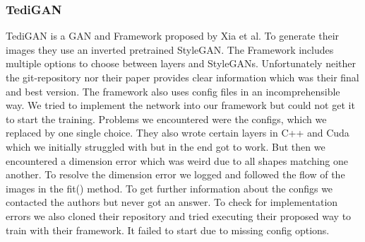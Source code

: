 \documentclass[12pt, a4paper]{article}
\begin{document}
\subsubsection{TediGAN}
\label{tedi}
TediGAN is a GAN and Framework proposed by Xia et al. To generate their images they use an inverted pretrained StyleGAN. The Framework includes multiple options to choose between layers and StyleGANs. 
Unfortunately neither the git-repository nor their paper provides clear information which was their final and best version. The framework also uses config files in an incomprehensible way. We tried to 
implement the network into our framework but could not get it to start the training. Problems we encountered were the configs, which we replaced by one single choice. They also wrote certain layers in C++ and
Cuda which we initially struggled with but in the end got to work. But then we encountered a dimension error which was weird due to all shapes matching one another. To resolve the dimension error we 
logged and followed the flow of the images in the fit() method. To get further information about the configs we contacted the authors but never got an answer.
To check for implementation errors we also cloned their repository and tried executing their proposed way to train with their framework. It failed to start due to missing config options.
\end{document}
